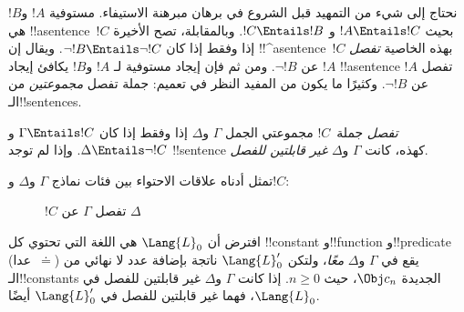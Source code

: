 \documentclass[../../../include/open-logic-section]{subfiles}
\begin{document}


نحتاج إلى شيء من التمهيد قبل الشروع في برهان مبرهنة الاستيفاء. مستوفية
$!A$ و$!B$ هي !!a{sentence}~$!C$ بحيث $!A \Entails !C$ و
$!C \Entails !B$. وبالمقابلة، تصح الأخيرة إذا وفقط إذا كان
$\lnot !B \Entails \lnot !C$. ويقال إن !!^a{sentence}~$!C$ بهذه
الخاصية \emph{تفصل} $!A$ عن $\lnot !B$. ومن ثم فإن إيجاد مستوفية لـ
$!A$ و$!B$ يكافئ إيجاد !!a{sentence} تفصل $!A$ عن $\lnot !B$.
وكثيرًا ما يكون من المفيد النظر في تعميم: جملة تفصل \emph{مجموعتين} من
الـ!!{sentence}s.

\begin{defn}
\emph{تفصل} جملة~$!C$ مجموعتي الجمل $\Gamma$ و$\Delta$ إذا وفقط إذا كان
$\Gamma \Entails !C$ و$\Delta \Entails \lnot !C$. وإذا لم توجد
!!{sentence} كهذه، كانت $\Gamma$ و$\Delta$ \emph{غير قابلتين للفصل}.
\end{defn}

تمثل أدناه علاقات الاحتواء بين فئات نماذج $\Gamma$ و$\Delta$ و$!C$:
\begin{figure}[h]
  \centering
  \caption{$!C$ تفصل $\Gamma$ عن $\Delta$}
\end{figure}


\begin{lem}
افترض أن $\Lang{L}_0$ هي اللغة التي تحتوي كل !!{constant} و!!{function}
و!!{predicate} (عدا~$\doteq$) يقع في $\Gamma$ و$\Delta$ \emph{معًا}،
ولتكن $\Lang{L}'_0$ ناتجة بإضافة عدد لا نهائي من الـ!!{constant}s الجديدة
$\Obj c_n$، حيث $n \ge 0$. إذا كانت $\Gamma$ و$\Delta$ غير قابلتين
للفصل في $\Lang{L}_0$، فهما غير قابلتين للفصل في $\Lang{L}'_0$ أيضًا.
\end{lem}
\end{document}
